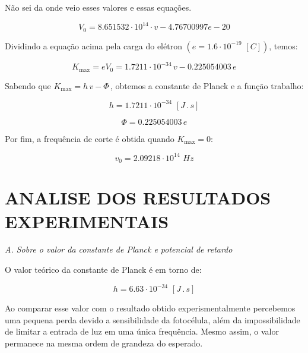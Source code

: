 \documentclass[10pt,twocolumn,letterpaper]{article}
\begin{document}
{\color{red} Não sei da onde veio esses valores e essas equações.}

\begin{equation*}
    V_0 = 8.651532\cdot 10^{14} \cdot v - 4.76700997e-20
\end{equation*}

\hspace{1cm} Dividindo a equação acima pela carga do elétron $(e =
1.6 \cdot 10^{-19} \,\, [C])$, temos:

\begin{equation*}
    K_{\max} = eV_0 = 1.7211 \cdot 10^{-34}\,v - 0.225054003\,e
\end{equation*}

\hspace{1cm} Sabendo que $K_{\max} = h\,v - \Phi\,$, obtemos a constante de
Planck e a função trabalho:

\begin{equation*}
    h = 1.7211\cdot 10^{-34} \,\, [J\,.\,s]
\end{equation*}

\begin{equation*}
    \Phi = 0.225054003\,e
\end{equation*}

\noindent Por fim, a frequência de corte é obtida quando $K_{\max} = 0$:

\begin{equation*}
    v_0 = 2.09218 \cdot 10^{14} \,\, Hz
\end{equation*}


\section{ANALISE DOS RESULTADOS EXPERIMENTAIS}

\noindent\textit{A. Sobre o valor da constante de Planck e potencial de
retardo}

\noindent O valor teórico da constante de Planck é em torno de:

\begin{equation*}
    h = 6.63 \cdot 10^{-34} \,\, [J\,.\,s]
\end{equation*}

\hspace{1cm} Ao comparar esse valor com o resultado obtido experismentalmente percebemos uma pequena perda devido a sensibilidade da fotocélula, além da impossibilidade de limitar a entrada de luz em uma única frequência. Mesmo assim, o valor permanece na mesma ordem de grandeza do esperado.
\end{document}
